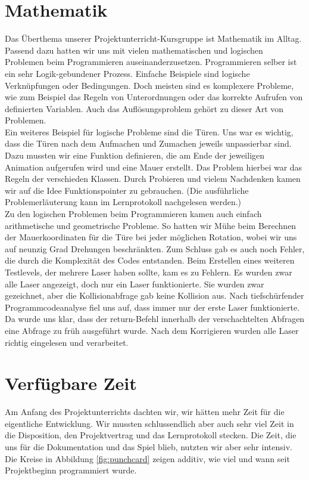 \documentclass[11pt,a4paper]{scrbook}
\begin{document}
\section{Mathematik}
Das Überthema unserer Projektunterricht-Kursgruppe ist Mathematik im Alltag.
Passend dazu hatten wir uns mit vielen mathematischen und logischen Problemen beim Programmieren auseinanderzusetzen.
Programmieren selber ist ein sehr Logik-gebundener Prozess.
Einfache Beispiele sind logische Verknüpfungen oder Bedingungen.
Doch meisten sind es komplexere Probleme, wie zum Beispiel das Regeln von Unterordnungen oder das korrekte Aufrufen von definierten Variablen.
Auch das Auflösungsproblem gehört zu dieser Art von Problemen.
\\
Ein weiteres Beispiel für logische Probleme sind die Türen.
Uns war es wichtig, dass die Türen nach dem Aufmachen und Zumachen jeweils unpassierbar sind.
Dazu mussten wir eine Funktion definieren, die am Ende der jeweiligen Animation aufgerufen wird und eine Mauer erstellt.
Das Problem hierbei war das Regeln der verschieden Klassen.
Durch Probieren und vielem Nachdenken kamen wir auf die Idee Funktionspointer zu gebrauchen.
(Die ausführliche Problemerläuterung kann im Lernprotokoll nachgelesen werden.)
\\
Zu den logischen Problemen beim Programmieren kamen auch einfach arithmetische und geometrische Probleme.
So hatten wir Mühe beim Berechnen der Mauerkoordinaten für die Türe bei jeder möglichen Rotation, wobei wir uns auf neunzig Grad Drehungen beschränkten.
Zum Schluss gab es auch noch Fehler, die durch die Komplexität des Codes entstanden.
Beim Erstellen eines weiteren Testlevels, der mehrere Laser haben sollte, kam es zu Fehlern.
Es wurden zwar alle Laser angezeigt, doch nur ein Laser funktionierte.
Sie wurden zwar gezeichnet, aber die Kollisionabfrage gab keine Kollision aus.
Nach tiefschürfender Programmcodeanalyse fiel uns auf, dass immer nur der erste Laser funktionierte. Da wurde uns klar, dass der return-Befehl innerhalb der verschachtelten Abfragen eine Abfrage zu früh ausgeführt wurde. Nach dem Korrigieren wurden alle Laser richtig eingelesen und verarbeitet.



\section{Verfügbare Zeit}
Am Anfang des Projektunterrichts dachten wir, wir hätten mehr Zeit für die eigentliche Entwicklung. Wir mussten schlussendlich aber auch
sehr viel Zeit in die Disposition, den Projektvertrag und das Lernprotokoll stecken. Die Zeit, die uns für die Dokumentation und das Spiel
blieb, nutzten wir aber sehr intensiv. Die Kreise in Abbildung \ref{fig:punchcard} zeigen additiv, wie viel und wann seit Projektbeginn programmiert wurde.
\end{document}
